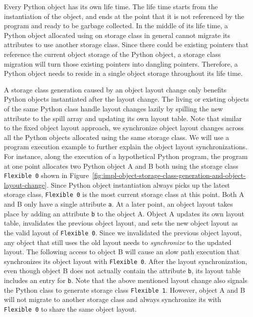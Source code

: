 Every Python object has its own life time.
The life time starts from the instantiation of the object, and ends at the point that it is not referenced by the program and ready to be garbage collected.
In the middle of its life time, a Python object allocated using on storage class in general cannot migrate its attributes to use another storage class.
Since there could be existing pointers that reference the current object storage of the Python object, a storage class migration will turn those existing pointers into dangling pointers.
Therefore, a Python object needs to reside in a single object storage throughout its life time.

A storage class generation caused by an object layout change only benefits Python objects instantiated after the layout change.
The living or existing objects of the same Python class handle layout changes lazily by spilling the new attribute to the spill array and updating its own layout table.
Note that similar to the fixed object layout approach, we synchronize object layout changes across all the Python objects allocated using the same storage class.
We will use a program execution example to further explain the object layout synchronizations.
For instance, along the execution of a hypothetical Python program, the program at one point allocates two Python object \textsf{A} and \textsf{B} both using the storage class \texttt{Flexible 0} shown in Figure~\ref{fig:impl-object-storage-class-generation-and-object-layout-change}.
Since Python object instantiation always picks up the latest storage class, \texttt{Flexible 0} is the most current storage class at this point.
Both \textsf{A} and \textsf{B} only have a single attribute \texttt{a}.
At a later point, an object layout takes place by adding an attribute \texttt{b} to the object \textsf{A}.
Object \textsf{A} updates its own layout table, invalidates the previous object layout, and sets the new object layout as the valid layout of \texttt{Flexible 0}.
Since we invalidated the previous object layout, any object that still uses the old layout needs to \emph{synchronize} to the updated layout.
The following access to object \textsf{B} will cause an slow path execution that synchronizes its object layout with \texttt{Flexible 0}.
After the layout synchronization, even though object \textsf{B} does not actually contain the attribute \texttt{b}, its layout table includes an entry for \texttt{b}.
Note that the above mentioned layout change also signals the Python class to generate storage class \texttt{Flexible 1}.
However, object \textsf{A} and \textsf{B} will not migrate to another storage class and always synchronize its with \texttt{Flexible 0} to share the same object layout.


